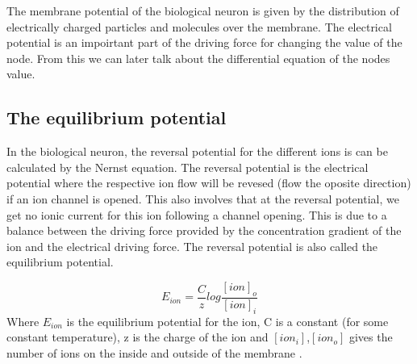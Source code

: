 The membrane potential of the biological neuron is given by the distribution of electrically charged particles and molecules over the  membrane.
The electrical potential is an impoirtant part of the driving force for changing the value of the node.
From this we can later talk about the differential equation of the nodes value.





\subsection{The equilibrium potential}
\label{ssecTheEquilibriumPotential}
In the biological neuron, the reversal potential for the different ions is can be calculated by the Nernst equation. 
The reversal potential is the electrical potential where the respective ion flow will be revesed (flow the oposite direction) if an ion channel is opened.
This also involves that at the reversal potential, we get no ionic current for this ion following a channel opening.  %
This is due to a balance between the driving force provided by the concentration gradient of the ion and the electrical driving force.
The reversal potential is also called the equilibrium potential.

\begin{equation}
	\label{eqNernstEquation}
 	E_{ion} = \frac{C}{z} log\frac{[ion]_o}{[ion]_i}
\end{equation}
Where $E_{ion}$ is the equilibrium potential for the ion, C is a constant (for some constant temperature), z is the charge of the ion and $[ion_i]$,$[ion_o]$ gives the number of ions on the inside and outside of the membrane
\cite{NeuroscienceExploringTheBrain3edKAP3}.

